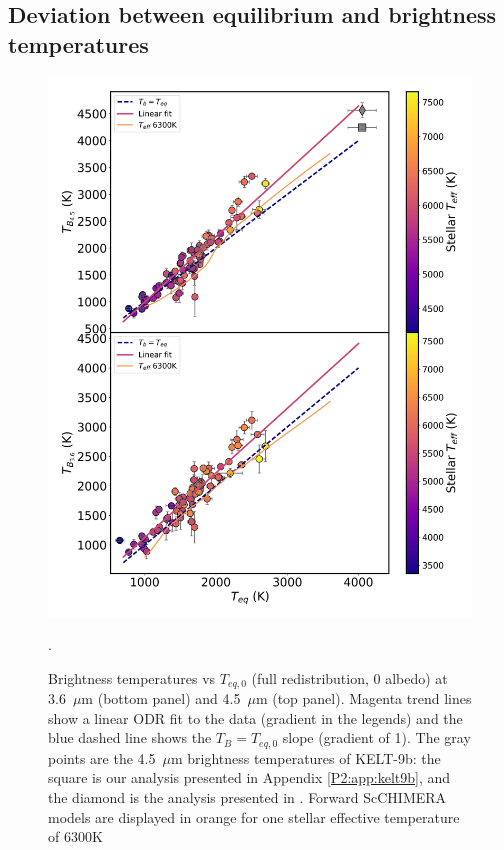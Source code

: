 \subsection{Deviation between equilibrium and brightness temperatures}
\label{P2:sec:individualTb}

\begin{figure}
    \centering
    \includegraphics[trim={0cm 0cm 0cm 0cm},clip,width=\linewidth]{TeqvsTb_PHOENIX_intplwitoutliers.pdf}
    \caption{Brightness temperatures vs $T_{eq,\textit{0}}$ (full redistribution, 0 albedo) at 3.6~$\mu$m (bottom panel) and 4.5~$\mu$m (top panel). Magenta trend lines show a linear ODR fit to the data (gradient in the legends) and the blue dashed line shows the $T_B = T_{eq,\textit{0}}$ slope (gradient of 1). The gray points are the 4.5~$\mu$m brightness temperatures of KELT-9b: the square is our analysis presented in Appendix \ref{P2:app:kelt9b}, and the diamond is the analysis presented in \citet{Mansfield2020}. Forward ScCHIMERA models are displayed in orange for one stellar effective temperature of 6300K}.
    \label{P2:fig:Tbs}
\end{figure}

